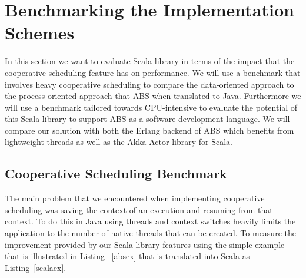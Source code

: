 \section{Benchmarking the Implementation Schemes}
\label{bench}

In this section we want to evaluate Scala library in terms of the impact that the cooperative scheduling feature has on performance. We will use a benchmark that involves heavy cooperative scheduling to compare the data-oriented approach to the process-oriented approach that ABS when translated to Java. Furthermore we will use a benchmark tailored towards CPU-intensive to evaluate the potential of this Scala library to support ABS as a software-development language. We will compare our solution with both the Erlang backend of ABS which benefits from lightweight threads as well as the Akka Actor library for Scala.

\subsection{Cooperative Scheduling Benchmark}
The main problem that we encountered when implementing cooperative scheduling was saving the context of an execution and resuming from that context. To do this in Java using threads and context switches heavily limits the application to the number of native threads that can be created.  To measure the improvement provided by our Scala library features using the simple example that is illustrated in Listing ~\ref{absex} that is translated into Scala as Listing~\ref{scalaex}.


